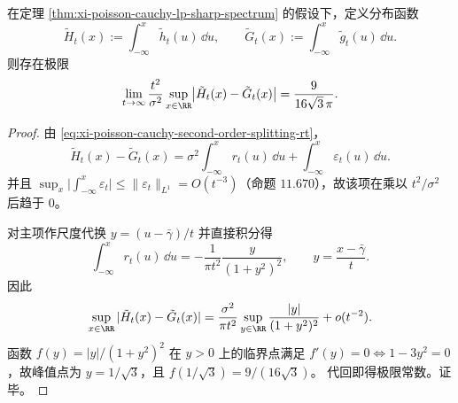 \begin{theorem}\label{thm:xi-poisson-cauchy-kolmogorov-second-order-constant}
在定理 \ref{thm:xi-poisson-cauchy-lp-sharp-spectrum} 的假设下，定义分布函数
\[
\tilde H_t(x):=\int_{-\infty}^{x}\tilde h_t(u)\,\dd u,
\qquad
\tilde G_t(x):=\int_{-\infty}^{x}\tilde g_t(u)\,\dd u.
\]
则存在极限
\[
\lim_{t\to\infty}\frac{t^{2}}{\sigma^2}\sup_{x\in\RR}\bigl|\tilde H_t(x)-\tilde G_t(x)\bigr|
=\frac{9}{16\sqrt3\,\pi}.
\]
\end{theorem}
\begin{proof}
由 \eqref{eq:xi-poisson-cauchy-second-order-splitting-rt}，
\[
\tilde H_t(x)-\tilde G_t(x)
=\sigma^2\int_{-\infty}^{x}r_t(u)\,\dd u+\int_{-\infty}^{x}\varepsilon_t(u)\,\dd u.
\]
并且 \(\sup_x\bigl|\int_{-\infty}^x\varepsilon_t\bigr|\le \|\varepsilon_t\|_{L^1}=O(t^{-3})\)（命题 \(11.670\)），故该项在乘以 \(t^2/\sigma^2\) 后趋于 \(0\)。

对主项作尺度代换 \(y=(u-\bar\gamma)/t\) 并直接积分得
\[
\int_{-\infty}^{x}r_t(u)\,\dd u
=-\frac{1}{\pi t^2}\frac{y}{(1+y^2)^2},
\qquad y=\frac{x-\bar\gamma}{t}.
\]
因此
\[
\sup_{x\in\RR}|\tilde H_t(x)-\tilde G_t(x)|
=\frac{\sigma^2}{\pi t^2}\sup_{y\in\RR}\frac{|y|}{(1+y^2)^2}+o(t^{-2}).
\]
函数 \(f(y)=|y|/(1+y^2)^2\) 在 \(y>0\) 上的临界点满足 \(f'(y)=0\iff 1-3y^2=0\)，故峰值点为 \(y=1/\sqrt3\)，且
\(
f(1/\sqrt3)=9/(16\sqrt3)
\)。
代回即得极限常数。证毕。
\end{proof}

